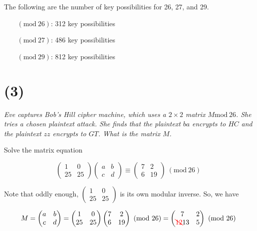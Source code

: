 \documentclass[12pt]{article}
\renewcommand{\mod}[1]{\mathrm{mod}\ #1}
\renewcommand{\pmod}[1]{\ (\mod{#1})}
\begin{document}
The following are the number of key possibilities for 26, 27, and 29.

\begin{itemize}
  \item[$\pmod{26}$:] 312 key possibilities
  \item[$\pmod{27}$:] 486 key possibilities
  \item[$\pmod{29}$:] 812 key possibilities
\end{itemize}

\section*{(3)} \textit{Eve captures Bob’s Hill cipher machine, which uses a $2\times2$ matrix $M \mod{26}$. She tries a chosen plaintext attack. She finds that the plaintext $ba$ encrypts to $HC$ and the plaintext $zz$ encrypts to $GT$. What is the matrix $M$.}

Solve the matrix equation

$$\begin{pmatrix}1 & 0\\25 & 25\end{pmatrix}\begin{pmatrix}a & b\\c & d\end{pmatrix} \equiv \begin{pmatrix}7 & 2\\6 & 19\end{pmatrix} \pmod{26}$$

Note that oddly enough, $\begin{pmatrix}1 & 0\\25 & 25\end{pmatrix}$ is its own modular inverse. So, we have

$$M = \begin{pmatrix}a & b\\c & d\end{pmatrix} = \begin{pmatrix}1 & 0\\25 & 25\end{pmatrix}\begin{pmatrix}7 & 2\\6 & 19\end{pmatrix} \pmod{26} = \begin{pmatrix}7 & 2\\ {\color{red}\bcancel{12}} 13 & 5\end{pmatrix} \pmod{26}$$
\end{document}

